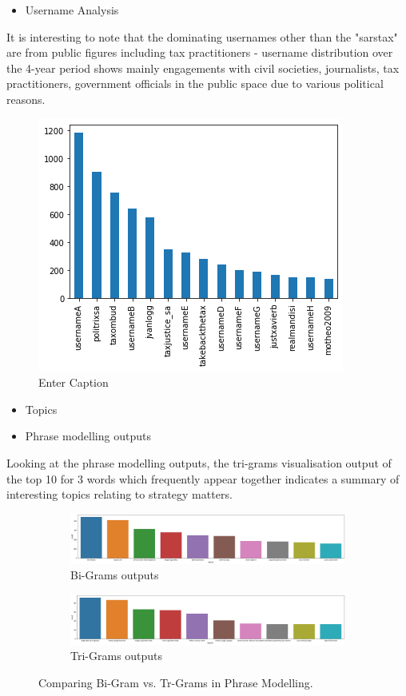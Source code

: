 \begin{itemize}
    \item Username Analysis
\end{itemize}

It is interesting to note that the dominating usernames other than the "sarstax" are from public figures including tax practitioners - username distribution over the 4-year period shows mainly engagements with civil societies, journalists, tax practitioners, government officials in the public space due to various political reasons.  

\begin{figure}
    \centering
    \includegraphics[width=0.1\linewidth]{postgrad_template 2/chapters/chapter1/usenames for second data.png}
    \caption{Enter Caption}
    \label{fig:enter-label}
\end{figure}

\begin{itemize}
    \item Topics 
\end{itemize}

\begin{itemize}
    \item Phrase modelling outputs
\end{itemize}


Looking at the phrase modelling outputs, the tri-grams visualisation output of the top 10 for 3 words which frequently appear together indicates a summary of interesting topics relating to strategy matters.

\begin{figure}
      \centering
	    \begin{subfigure}{0.3\linewidth}
		\includegraphics[width=\linewidth]{postgrad_template 2/chapters/chapter1/Bi-grams for second second user data.png}
		\caption{Bi-Grams outputs}
		\label{fig: Associated Bi-Grams Outputs}
	   \end{subfigure}
	   \begin{subfigure}{0.3\linewidth}
		\includegraphics[width=\linewidth]{postgrad_template 2/chapters/chapter1/Tri-gram second second user data.png}
		\caption{Tri-Grams outputs}
		\label{fig:Associated Tri-Gram Outputs}
	    \end{subfigure}
	   \vfill
	 \caption{Comparing Bi-Gram vs. Tr-Grams in Phrase Modelling.}
\end{figure}

